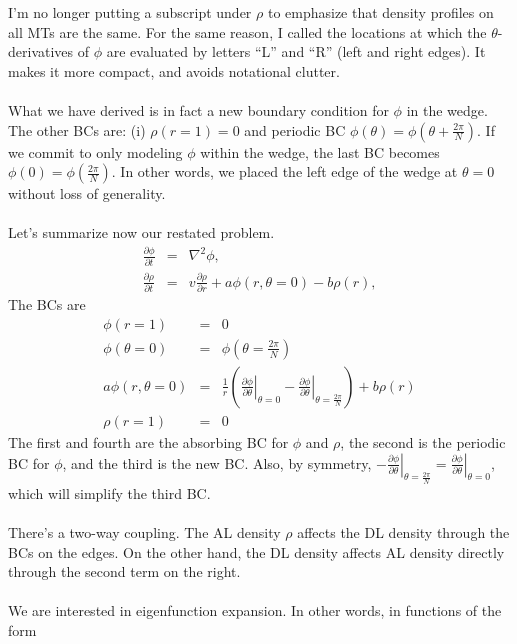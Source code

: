 \documentclass{article}
\begin{document}
I'm no longer putting a subscript under $\rho$ to emphasize that density profiles on all MTs are the same.   For the same reason, I called the locations at which the $\theta$-derivatives of $\phi$ are evaluated by letters ``L'' and ``R'' (left and right edges).  It makes it more compact, and avoids notational clutter.  
\\
\\
What we have derived is in fact a new boundary condition for $\phi$ in the wedge.  The other BCs are: (i) $\rho(r=1) = 0$ and periodic BC $\phi(\theta) = \phi\left(\theta+\frac{2\pi}{N}\right)$.  If we commit to only modeling $\phi$ within the wedge, the last BC becomes $\phi(0) = \phi\left(\frac{2\pi}{N}\right)$.   In other words, we placed the left edge of the wedge at $\theta=0$ without loss of generality.
\\
\\
Let's summarize now our restated problem.  
\begin{eqnarray}
\label{eq:one_new} \frac{\partial \phi}{\partial t} &=& \nabla^2 \phi, \\
\label{eq:two_new} \frac{\partial \rho}{\partial t} &=& v \frac{\partial \rho}{\partial r} + a\phi(r,\theta =0) - b \rho(r),
\end{eqnarray}
The BCs are
\begin{eqnarray}
\phi(r=1) &=& 0  \\
\phi(\theta=0) &=& \phi(\theta = \frac{2\pi}{N})  \\
a \phi(r,\theta=0) &=& \frac{1}{r}\left(\left. \frac{\partial \phi}{\partial \theta} \right|_{\theta=0} - \left. \frac{\partial \phi}{\partial \theta} \right|_{\theta=\frac{2\pi}{N}} \right) + b \rho(r) \\
\label{eq:BC4} \rho(r=1) &=& 0
\end{eqnarray}
The first and fourth are the absorbing BC for $\phi$ and $\rho$, the second is the periodic BC for $\phi$, and the third is the new BC.  Also, by symmetry, $-\left. \frac{\partial \phi}{\partial \theta} \right|_{\theta=\frac{2\pi}{N}} = \left. \frac{\partial \phi}{\partial \theta} \right|_{\theta=0}$, which will simplify the third BC.
\\
\\
There's a two-way coupling. The AL density $\rho$ affects the DL density through the BCs on the edges.  On the other hand, the DL density affects AL density directly through the second term on the right.
\\
\\
We are interested in eigenfunction expansion.  In other words, in functions of the form 
\end{document}
